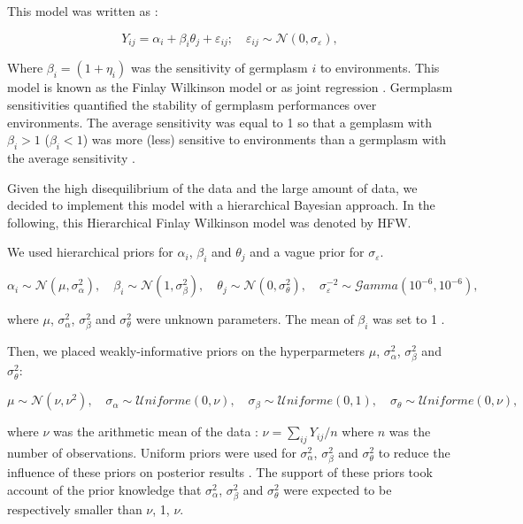 \documentclass{book}\usepackage[]{graphicx}\usepackage[]{color}
\begin{document}
This model was written as :

\begin{equation}
Y_{ij}  = \alpha_{i} + \beta_{i} \theta_{j} + \varepsilon_{ij}; \quad \varepsilon_{ij} \sim \mathcal{N} (0,\sigma_{\varepsilon}),
	\label{model2}
\end{equation}

Where $\beta_{i} = (1 + \eta_{i})$ was the sensitivity of germplasm $i$ to environments.
This model is known as the Finlay Wilkinson model or as joint regression \citep{finlay_analysis_1963}.
Germplasm sensitivities quantified the stability of germplasm performances over environments.
The average sensitivity was equal to 1 so that a gemplasm with $\beta_{i} > 1$ ($\beta_{i} < 1$) was more (less) sensitive to environments than a germplasm with the average sensitivity \citep{nabugoomu_analysis_1999}.

Given the high disequilibrium of the data and the large amount of data, we decided to implement this model with a hierarchical Bayesian approach.
In the following, this Hierarchical Finlay Wilkinson model was denoted by HFW.

We used hierarchical priors for $\alpha_i$, $\beta_i$ and $\theta_j$ and a vague prior for $\sigma_{\varepsilon}$.

\begin{displaymath}
\alpha_{i} \sim \mathcal{N} (\mu,\sigma^2_{\alpha}), \quad 
\beta_{i} \sim \mathcal{N} (1,\sigma^2_{\beta}), \quad 
\theta_{j} \sim \mathcal{N} (0,\sigma^2_{\theta}), \quad 
\sigma^{-2}_{\varepsilon} \sim \mathcal{G}amma (10^{-6},10^{-6}),
\end{displaymath}

where $\mu$, $\sigma^2_{\alpha}$, $\sigma^2_{\beta}$ and $\sigma^2_{\theta}$ were unknown parameters.
The mean of $\beta_i$ was set to 1 \citep{nabugoomu_analysis_1999}.


Then, we placed weakly-informative priors on the hyperparmeters  $\mu$, $\sigma^2_{\alpha}$, $\sigma^2_{\beta}$ and $\sigma^2_{\theta}$:

\begin{displaymath}
\mu \sim \mathcal{N} (\nu,\nu^2), \quad 
\sigma_{\alpha} \sim \mathcal{U}niforme (0,\nu), \quad 
\sigma_{\beta} \sim \mathcal{U}niforme (0,1), \quad 
\sigma_{\theta} \sim \mathcal{U}niforme (0,\nu),
\end{displaymath}

where $\nu$ was the arithmetic mean of the data : $\nu = \sum_{ij} {Y_{ij}/n}$ where $n$ was the number of observations.
Uniform priors were used for $\sigma^2_{\alpha}$, $\sigma^2_{\beta}$ and $\sigma^2_{\theta}$ to reduce the influence of these priors on posterior results \citep{gelman__2006}.
The support of these priors took account of the prior knowledge that $\sigma^2_{\alpha}$, $\sigma^2_{\beta}$ and $\sigma^2_{\theta}$ were expected to be respectively smaller than $\nu$, 1, $\nu$. \\
\end{document}
